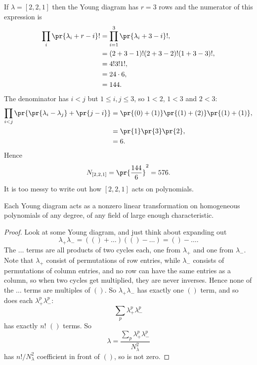 \begin{example}
If \(\lambda=[2,2,1]\) then the Young diagram has \(r=3\) rows and the numerator of this expression is
\begin{align*}
\prod_i\pr{\lambda_i+r-i}!
&=
\prod_{i=1}^3\pr{\lambda_i+3-i}!,
\\
&=
(2+3-1)!(2+3-2)!(1+3-3)!,
\\
&=4!3!1!,
\\
&=24 \cdot 6,\\
&=144.
\end{align*}
The denominator has \(i<j\) but \(1 \le i,j \le 3\), so \(1<2\), \(1<3\) and \(2<3\):
\begin{align*}
\prod_{i<j}\pr{\pr{\lambda_i-\lambda_j}+\pr{j-i}}
&=\pr{(0)+(1)}\pr{(1)+(2)}\pr{(1)+(1)},\\
&=\pr{1}\pr{3}\pr{2},\\
&=6.
\end{align*}
Hence
\[
N_{[2,2,1]}=\pr{\frac{144}{6}}^2=576.
\]
It is too messy to write out how \([2,2,1]\) acts on polynomials.
\end{example}



\begin{lemma}\label{lemma:1.coeff}
Each Young diagram acts as a nonzero linear transformation on homogeneous polynomials of any degree, of any field of large enough characteristic.
\end{lemma}
\begin{proof}
Look at some Young diagram, and just think about expanding out
\[
\lambda_+\lambda_-=(()+\dots)(()-\dots)=()-\dots.
\]
The \(\dots\) terms are all products of two cycles each, one from \(\lambda_+\) and one from \(\lambda_-\).
Note that \(\lambda_+\) consist of permutations of row entries, while \(\lambda_-\) consists of permutations of column entries, and no row can have the same entries as a column, so when two cycles get multiplied, they are never inverses.
Hence none of the \(\dots\) terms are multiples of \(()\).
So \(\lambda_+\lambda_-\) has exactly one \(()\) term, and so does each \(\lambda_+^p \lambda_-^p\):
\[
\sum_p \lambda_+^p \lambda_-^p
\]
has exactly \(n!\) \(()\) terms.
So 
\[
\lambda=\frac{\sum_p\lambda^p_+ \lambda^p_-}{N^2_{\lambda}}
\]
has \(n!/N^2_{\lambda}\) coefficient in front of \(()\), so is not zero.
\end{proof}

